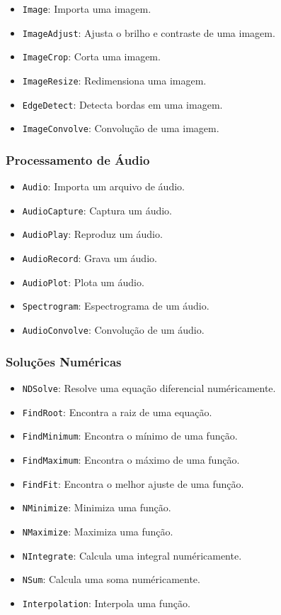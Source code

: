 \documentclass[a4paper, 12pt]{article}
\begin{document}
\begin{itemize}
    \item \texttt{Image}: Importa uma imagem.
    \item \texttt{ImageAdjust}: Ajusta o brilho e contraste de uma imagem.
    \item \texttt{ImageCrop}: Corta uma imagem.
    \item \texttt{ImageResize}: Redimensiona uma imagem.
    \item \texttt{EdgeDetect}: Detecta bordas em uma imagem.
    \item \texttt{ImageConvolve}: Convolução de uma imagem.
\end{itemize}


\subsubsection{Processamento de Áudio}\label{processamento-de-audio}

\begin{itemize}
    \item \texttt{Audio}: Importa um arquivo de áudio.
    \item \texttt{AudioCapture}: Captura um áudio.
    \item \texttt{AudioPlay}: Reproduz um áudio.
    \item \texttt{AudioRecord}: Grava um áudio.
    \item \texttt{AudioPlot}: Plota um áudio.
    \item \texttt{Spectrogram}: Espectrograma de um áudio.
    \item \texttt{AudioConvolve}: Convolução de um áudio.
\end{itemize}

\subsubsection{Soluções Numéricas}\label{solucoes-numericas}

\begin{itemize}
    \item \texttt{NDSolve}: Resolve uma equação diferencial numéricamente.
    \item \texttt{FindRoot}: Encontra a raiz de uma equação.
    \item \texttt{FindMinimum}: Encontra o mínimo de uma função.
    \item \texttt{FindMaximum}: Encontra o máximo de uma função.
    \item \texttt{FindFit}: Encontra o melhor ajuste de uma função.
    \item \texttt{NMinimize}: Minimiza uma função.
    \item \texttt{NMaximize}: Maximiza uma função.
    \item \texttt{NIntegrate}: Calcula uma integral numéricamente.
    \item \texttt{NSum}: Calcula uma soma numéricamente.
    \item \texttt{Interpolation}: Interpola uma função.
\end{itemize}
\end{document}
